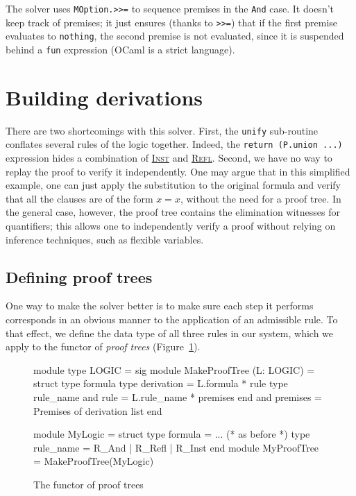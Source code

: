 \documentclass{easychair}
\def\li{\lstinline}
\let\TirName\textsc
\renewcommand{\DefTirName}[1]{\hyperlink{#1}{\TirName {#1}}}
\let\Rule\DefTirName
\newcommand{\fref}[1]{Figure~\ref{fig:#1}}
\begin{document}
The solver uses \li+MOption.>>=+ to sequence premises in the \li+And+ case. It
doesn't keep track of premises; it just ensures (thanks to \li+>>=+) that if the
first premise evaluates to \li+nothing+, the second premise is not evaluated,
since it is suspended behind a \li+fun+ expression (OCaml is a strict language).

\section{Building derivations}

There are two shortcomings with this solver. First, the \li+unify+ sub-routine
conflates several rules of the logic together. Indeed, the \li+return (P.union ...)+
expression hides a combination of \Rule{Inst} and \Rule{Refl}. Second, we
have no way to replay the proof to verify it independently. One may argue that
in this simplified example, one can just apply the substitution to the original
formula and verify that all the clauses are of the form $x = x$, without the
need for a proof tree. In the general case, however, the proof tree contains the
elimination witnesses for quantifiers; this allows one to independently verify a
proof without relying on inference techniques, such as flexible variables.

\subsection{Defining proof trees}

One way to make the solver better is to make sure each step it performs
corresponds in an obvious manner to the application of an admissible rule. To
that effect, we define the data type of all three rules in our system, which we
apply to the functor of \emph{proof trees} (\fref{proof-trees}).

\begin{figure}
  \centering
\begin{ocaml}
module type LOGIC = sig     module MakeProofTree (L: LOGIC) = struct
  type formula                type derivation = L.formula * rule
  type rule_name              and rule = L.rule_name * premises
end                           and premises = Premises of derivation list
                            end 

module MyLogic = struct
  type formula = ... (* as before *)
  type rule_name = R_And | R_Refl | R_Inst
end
module MyProofTree = MakeProofTree(MyLogic)
\end{ocaml}
  \caption{The functor of proof trees}
  \label{fig:proof-trees}
\end{figure}
\end{document}
